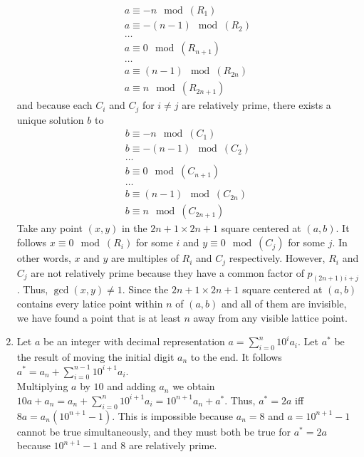 \documentclass[10pt]{article}
\begin{document}
\begin{enumerate}[label= (Q-\arabic*)]
    \begin{align*}
        a\equiv-n\mod(R_1)\\
        a\equiv-(n-1)\mod(R_2)\\
        \ldots\\
        a\equiv0\mod(R_{n+1})\\
        \ldots\\
        a\equiv(n-1)\mod(R_{2n})\\
        a\equiv n\mod(R_{2n+1})
    \end{align*} 
    and because each $C_i$ and $C_j$ for $i\neq j$ are relatively prime, there exists a unique solution $b$ to 
    \begin{align*}
        b\equiv-n\mod(C_1)\\
        b\equiv-(n-1)\mod(C_2)\\
        \ldots\\
        b\equiv0\mod(C_{n+1})\\
        \ldots\\
        b\equiv(n-1)\mod(C_{2n})\\
        b\equiv n\mod(C_{2n+1})
    \end{align*} 
    Take any point $(x,y)$ in the $2n+1\times2n+1$ square centered at $(a,b)$. It follows $x\equiv0\mod(R_i)$ for some $i$ and $y\equiv0\mod(C_j)$ for some $j$. 
    In other words, $x$ and $y$ are multiples of $R_i$ and $C_j$ respectively.
    However, $R_i$ and $C_j$ are not relatively prime because they have a common factor of $p_{(2n+1)i+j}$.
    Thus, $\gcd(x,y)\neq1$.
    Since the $2n+1\times2n+1$ square centered at $(a,b)$ contains every latice point within $n$ of $(a,b)$ and all of them are invisible, we have found a point that is at least $n$ away from any visible lattice point.
    \item Let $a$ be an integer with decimal representation $\displaystyle a=\sum_{i=0}^{n}10^{i}a_i$. 
    Let $a^*$ be the result of moving the initial digit $a_n$ to the end. 
    It follows $\displaystyle a^*=a_n+\sum_{i=0}^{n-1}10^{i+1}a_i$.\\
    Multiplying $a$ by $10$ and adding $a_n$ we obtain $\displaystyle 10a+a_n=a_n+\sum_{i=0}^{n}10^{i+1}a_i=10^{n+1}a_n+a^*$.
    Thus, $a^*=2a$ iff $8a=a_n(10^{n+1}-1)$. 
    This is impossible because $a_n=8$ and $a=10^{n+1}-1$ cannot be true simultaneously, and they must both be true for $a^*=2a$ because $10^{n+1}-1$ and $8$ are relatively prime.
\end{enumerate}
\end{document}
